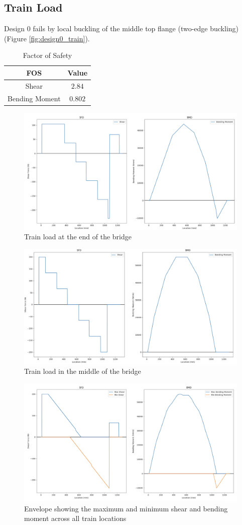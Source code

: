 \documentclass[11pt,twocolumn,letterpaper]{article}
\begin{document}
\subsection*{Train Load}
Design 0 fails by local buckling of the middle top flange (two-edge buckling) (Figure \ref{fig:design0_train}). 
\begin{table}[h]
\begin{center}
\begin{tabular}{|cc|} 
\hline
\multicolumn{1}{|c}{FOS} & \multicolumn{1}{c|}{Value} \\
\hline
Shear &   $2.84$ \\
Bending Moment &   $0.802$ \\
\hline
\end{tabular}
\caption{Factor of Safety}
\end{center}
\end{table}
\begin{figure}[h!]
  \centering
    \includegraphics[width=.39\textwidth]{figures/S,BTrainatend.png}
    \caption {Train load at the end of the bridge}
  \hfill
\end{figure}
\begin{figure}[h!]
  \centering
    \includegraphics[width=.39\textwidth]{figures/S,BTrainmiddle.png}
    \caption {Train load in the middle of the bridge}
  \hfill
\end{figure}
\begin{figure}[h!]
  \centering
    \includegraphics[width=.39\textwidth]{figures/SBTrainMaxDesign0.png}
    \caption {Envelope showing the maximum and minimum shear and bending moment across all train locations}
  \hfill
\end{figure}
\end{document}
